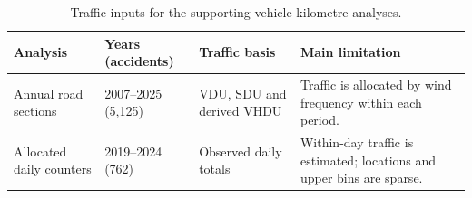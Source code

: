\begin{table}[H]
\centering
\footnotesize
\caption{Traffic inputs for the supporting vehicle-kilometre analyses.}
\label{tab:traffic-methods}
\begin{tabularx}{\textwidth}{L{0.17\textwidth}L{0.17\textwidth}L{0.22\textwidth}L{0.32\textwidth}}
\toprule
Analysis & Years (accidents) & Traffic basis & Main limitation \\
\midrule
Annual road sections & 2007--2025 (5,125) & VDU, SDU and derived VHDU & Traffic is allocated by wind frequency within each period. \\ \grayhline
Allocated daily counters & 2019--2024 (762) & Observed daily totals & Within-day traffic is estimated; locations and upper bins are sparse. \\
\bottomrule
\end{tabularx}
\end{table}

